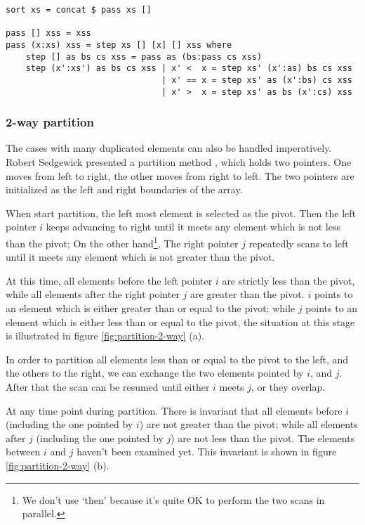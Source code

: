 \documentclass[UTF8]{article}
\begin{document}
\lstset{language=Haskell}
\begin{lstlisting}
sort xs = concat $ pass xs []

pass [] xss = xss
pass (x:xs) xss = step xs [] [x] [] xss where
    step [] as bs cs xss = pass as (bs:pass cs xss)
    step (x':xs') as bs cs xss | x' <  x = step xs' (x':as) bs cs xss
                               | x' == x = step xs' as (x':bs) cs xss
                               | x' >  x = step xs' as bs (x':cs) xss
\end{lstlisting} %

\subsubsection{2-way partition}
The cases with many duplicated elements can also be handled imperatively. Robert Sedgewick presented a partition
method \cite{qsort-impl}, \cite{pearls}
which holds two pointers. One moves from left to right, the other moves from right to left. The two pointers
are initialized as the left and right boundaries of the array.

When start partition, the left most element is selected as the pivot. Then the left pointer $i$
keeps advancing to right until it meets any element which is not less than the pivot; On the other hand\footnote{We don't use `then' because it's quite OK to perform the two scans in parallel.}, The right pointer $j$ repeatedly scans to
left until it meets any element which is not greater than the pivot.

At this time, all elements before the left pointer $i$ are strictly less than the pivot, while all
elements after the right pointer $j$ are greater than the pivot. $i$ points to an element which is
 either greater than or equal to the pivot; while $j$ points to an element which is either less than or
equal to the pivot, the situation at this stage is illustrated in figure \ref{fig:partition-2-way} (a).

In order to partition all elements less than or equal to the pivot to the left, and the others to the right,
we can exchange the two elements pointed by $i$, and $j$. After that the scan can be resumed until either
$i$ meets $j$, or they overlap.

At any time point during partition. There is invariant that all elements before $i$ (including the one
pointed by $i$) are not greater than
the pivot; while all elements after $j$ (including the one pointed by $j$) are not less than the pivot.
The elements between $i$ and $j$ haven't been examined yet. This invariant is shown in figure \ref{fig:partition-2-way} (b).
\end{document}

